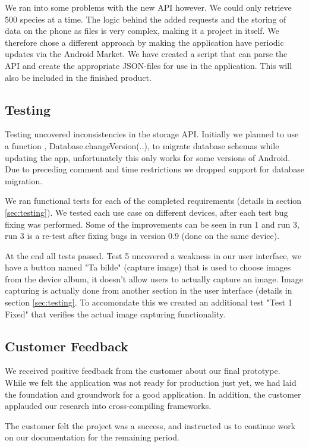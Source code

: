   We ran into some problems with the new API however. We could only retrieve 500 species at a time. The logic behind the added requests and the storing of data on the phone as files is very complex, making it a project in itself. We therefore chose a different approach by making the application have periodic updates via the Android Market. We have created a script that can parse the API and create the appropriate JSON-files for use in the application. This will also be included in the finished product. 

\subsection{Testing}

Testing uncovered inconsistencies in the storage API. Initially we planned to
use a function , Database.changeVersion(..), to migrate database schemas while
updating the app, unfortunately this only works for some versions of Android.
Due to preceding comment and time restrictions we dropped support for database
migration.

We ran functional tests for each of the completed requirements (details in
section \ref{sec:testing}). We tested each use case on different devices, after
each test bug fixing was performed. Some of the improvements can be seen in run
1 and run 3, run 3 is a re-test after fixing bugs in version 0.9 (done on the
same device). 

At the end all tests passed. Test 5 uncovered a weakness in our user interface,
we have a button named "Ta bilde" (capture image) that is used to choose images
from the device album, it doesn't allow users to actually capture an image.
Image capturing is actually done from another section in the user interface
(details in section \ref{sec:testing}. To accomondate this we created an
additional test "Test 1 Fixed" that verifies the actual image capturing
functionality.

\subsection{Customer Feedback}
We received positive feedback from the customer about our final prototype. While
we felt the application was not ready for production just yet, we had laid the
foundation and groundwork for a good application. In addition, the customer
applauded our research into cross-compiling frameworks.

The customer felt the project was a success, and instructed us to continue work
on our documentation for the remaining period. 


